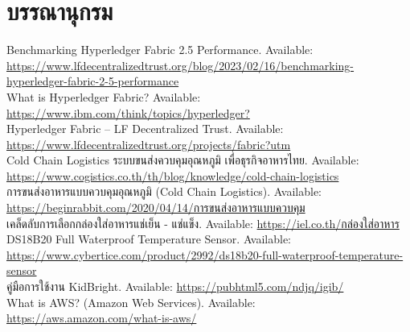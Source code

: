 \documentclass[final]{cpecmu}
\author{\makebox[6.5cm][l]{นางสาวนันท์นภัส ศิริธนาโชคไพศาล}}{\makebox[6.0cm][l]{Nunnapat Sirithanachokpaisan}}{650610776}
\author{\makebox[6.5cm][l]{นางสาวปิ่นนารี พร้อมมิตร}}{\makebox[6.0cm][l]{Pinnaree Prommitr}}{650610785}
\author{\makebox[6.5cm][l]{นายผืนป่า จำปาศรี}}{\makebox[6.0cm][l]{Phuenpa Champasri}}{650612090}
\begin{document}


\pagestyle{empty}\cleardoublepage
\normalspacing \setcounter{page}{1}  \pagestyle{cpecmu}





\ifproject

\fi

\cleardoublepage
{} 
\chapter*{บรรณานุกรม}

\noindent [1] Benchmarking Hyperledger Fabric 2.5 Performance. Available: \url{https://www.lfdecentralizedtrust.org/blog/2023/02/16/benchmarking-hyperledger-fabric-2-5-performance}\\

\noindent [2] What is Hyperledger Fabric? Available:
\url{https://www.ibm.com/think/topics/hyperledger?}\\

\noindent [3] Hyperledger Fabric – LF Decentralized Trust. Available: 
\url{https://www.lfdecentralizedtrust.org/projects/fabric?utm}\\

\noindent [4] Cold Chain Logistics ระบบขนส่งควบคุมอุณหภูมิ เพื่อธุรกิจอาหารไทย. Available: \url{https://www.cogistics.co.th/th/blog/knowledge/cold-chain-logistics}\\

\noindent [5] การขนส่งอาหารแบบควบคุมอุณหภูมิ (Cold Chain Logistics). Available: 
\url{https://beginrabbit.com/2020/04/14/การขนส่งอาหารแบบควบคุม}\\

\noindent [6] เคล็ดลับการเลือกกล่องใส่อาหารแช่เย็น - แช่แข็ง. Available:
\url{https://iel.co.th/กล่องใส่อาหาร}\\

\noindent [7] DS18B20 Full Waterproof Temperature Sensor. Available: 
\url{https://www.cybertice.com/product/2992/ds18b20-full-waterproof-temperature-sensor}\\

\noindent [8] คู่มือการใช้งาน KidBright. Available:
\url{https://pubhtml5.com/ndjq/igib/}\\

\noindent [9] What is AWS? (Amazon Web Services). Available: 
\url{https://aws.amazon.com/what-is-aws/}\\
\end{document}
